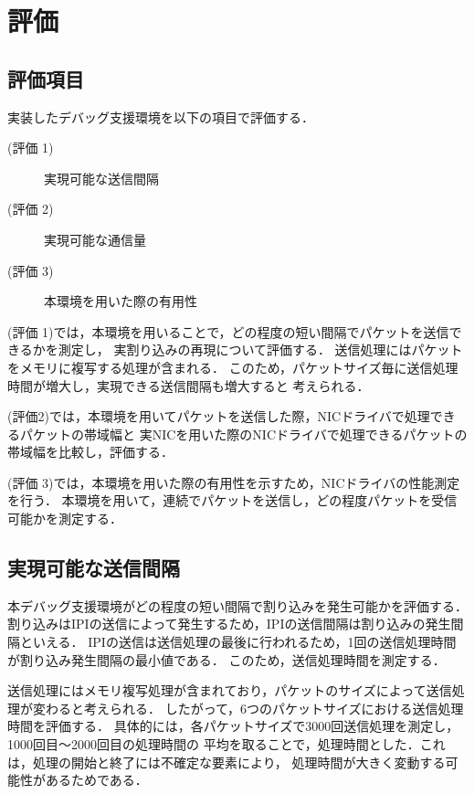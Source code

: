 \documentclass[submit,techreq,noauthor,dvipdfmx]{ipsj}
\begin{document}
\section{評価}\label{chap:evaluation}

\subsection{評価項目}\label{sec:item-of-evaluation}

実装したデバッグ支援環境を以下の項目で評価する．
\begin{description}
    \item[(評価 1)]実現可能な送信間隔
    \item[(評価 2)]実現可能な通信量
    \item[(評価 3)]本環境を用いた際の有用性
\end{description}

(評価 1)では，本環境を用いることで，どの程度の短い間隔でパケットを送信できるかを測定し，
実割り込みの再現について評価する．
送信処理にはパケットをメモリに複写する処理が含まれる．
このため，パケットサイズ毎に送信処理時間が増大し，実現できる送信間隔も増大すると
考えられる．

(評価2)では，本環境を用いてパケットを送信した際，NICドライバで処理できるパケットの帯域幅と
実NICを用いた際のNICドライバで処理できるパケットの帯域幅を比較し，評価する．

(評価 3)では，本環境を用いた際の有用性を示すため，NICドライバの性能測定を行う．
本環境を用いて，連続でパケットを送信し，どの程度パケットを受信可能かを測定する．

\subsection{実現可能な送信間隔}\label{sec:interval}

本デバッグ支援環境がどの程度の短い間隔で割り込みを発生可能かを評価する．
割り込みはIPIの送信によって発生するため，IPIの送信間隔は割り込みの発生間隔といえる．
IPIの送信は送信処理の最後に行われるため，1回の送信処理時間が割り込み発生間隔の最小値である．
このため，送信処理時間を測定する．

送信処理にはメモリ複写処理が含まれており，パケットのサイズによって送信処理が変わると考えられる．
したがって，6つのパケットサイズにおける送信処理時間を評価する．
具体的には，各パケットサイズで3000回送信処理を測定し，1000回目〜2000回目の処理時間の
平均を取ることで，処理時間とした．これは，処理の開始と終了には不確定な要素により，
処理時間が大きく変動する可能性があるためである．
\end{document}
